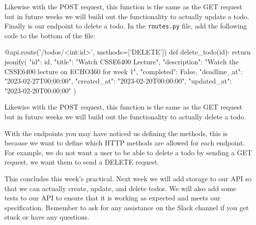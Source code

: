 \documentclass{csse4400}
\begin{document}
Likewise with the POST request, this function is the same as the GET request but in future weeks we will build out the functionality to actually update a todo. Finally is our endpoint to delete a todo. In the \texttt{routes.py} file, add the following code to the bottom of the file:

\begin{code}[language=python]{}
  @api.route('/todos/<int:id>', methods=['DELETE'])
  def delete_todo(id):
      return jsonify({
        "id": id,
        "title": "Watch CSSE6400 Lecture",
        "description": "Watch the CSSE6400 lecture on ECHO360 for week 1",
        "completed": False,
        "deadline_at": "2023-02-27T00:00:00",
        "created_at": "2023-02-20T00:00:00",
        "updated_at": "2023-02-20T00:00:00"
      })
\end{code}

Likewise with the POST request, this function is the same as the GET request but in future weeks we will build out the functionality to actually delete a todo.

With the endpoints you may have noticed us defining the methods, this is because we want to define which HTTP methods are allowed for each endpoint. For example, we do not want a user to be able to delete a todo by sending a GET request, we want them to send a DELETE request.

This concludes this week's practical.
Next week we will add storage to our API so that we can actually create, update, and delete todos.
We will also add some tests to our API to ensure that it is working as expected and meets our specification.
Remember to ask for any assistance on the Slack channel if you get stuck or have any questions.

%
%
\end{document}
